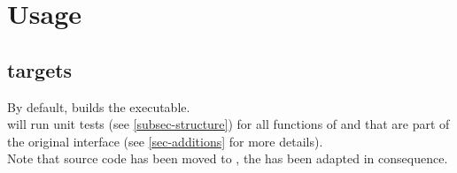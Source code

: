 \section{Usage}\label{sec-usage}

\subsection{ targets}

By default,  builds the  executable.\\
 will run unit tests (see \ref{subsec-structure}) for all functions of
 and  that are part of the original
interface (see \ref{sec-additions} for more details).\\

Note that source code has been moved to , the  has
been adapted in consequence.

